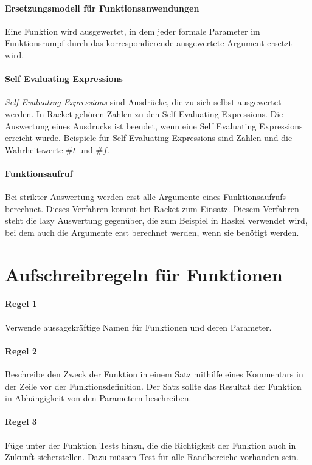 \documentclass[../main.tex]{subfiles}
\begin{document}
        \paragraph{Ersetzungsmodell für Funktionsanwendungen}
            Eine Funktion wird ausgewertet, in dem jeder formale Parameter im Funktionsrumpf durch das korrespondierende ausgewertete Argument ersetzt wird.
            
        \paragraph{Self Evaluating Expressions}
            \emph{Self Evaluating Expressions} sind Ausdrücke, die zu sich selbst ausgewertet werden. In Racket gehören Zahlen zu den Self Evaluating Expressions. Die Auswertung eines Ausdrucks ist beendet, wenn eine Self Evaluating Expressions erreicht wurde. Beispiele für Self Evaluating Expressions sind Zahlen und die Wahrheitswerte $\#t$ und $\#f$.
            
        \paragraph{Funktionsaufruf}
            Bei strikter Auswertung werden erst alle Argumente eines Funktionsaufrufs berechnet. Dieses Verfahren kommt bei Racket zum Einsatz. Diesem Verfahren steht die lazy Auswertung gegenüber, die zum Beispiel in Haskel verwendet wird, bei dem auch die Argumente erst berechnet werden, wenn sie benötigt werden.   
            
    \section{Aufschreibregeln für Funktionen}
        \paragraph{Regel 1}
            Verwende aussagekräftige Namen für Funktionen und deren Parameter.
        
        \paragraph{Regel 2}
            Beschreibe den Zweck der Funktion in einem Satz mithilfe eines Kommentars in der Zeile vor der Funktionsdefinition. Der Satz sollte das Resultat der Funktion in Abhängigkeit von den Parametern beschreiben.
            
        \paragraph{Regel 3}
            Füge unter der Funktion Tests hinzu, die die Richtigkeit der Funktion auch in Zukunft sicherstellen. Dazu müssen Test für alle Randbereiche vorhanden sein.
            
\end{document}
